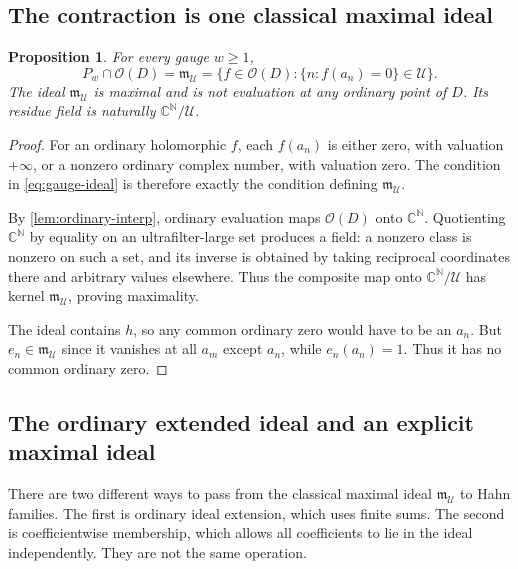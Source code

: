 \documentclass[11pt,letterpaper]{article}
\numberwithin{equation}{section}
\newtheorem{proposition}[theorem]{Proposition}
\theoremstyle{definition}
\theoremstyle{remark}
\newcommand{\C}{\mathbb C}
\newcommand{\N}{\mathbb N}
\newcommand{\OO}{\mathcal O}
\newcommand{\UU}{\mathcal U}
\newcommand{\mm}{\mathfrak m}
\begin{document}
\subsection{The contraction is one classical maximal ideal}
\begin{proposition}\label{prop:contraction}
For every gauge $w\ge1$,
\begin{equation}\label{eq:contraction}
 P_w\cap\OO(D)=\mm_\UU
   =\{f\in\OO(D):\{n:f(a_n)=0\}\in\UU\}.
\end{equation}
The ideal $\mm_\UU$ is maximal and is not evaluation at any ordinary
point of $D$. Its residue field is naturally $\C^\N/\UU$.
\end{proposition}
\begin{proof}
For an ordinary holomorphic $f$, each $f(a_n)$ is either zero, with
valuation $+\infty$, or a nonzero ordinary complex number, with valuation
zero. The condition in \eqref{eq:gauge-ideal} is therefore exactly the
condition defining $\mm_\UU$.

By \cref{lem:ordinary-interp}, ordinary evaluation maps $\OO(D)$ onto
$\C^\N$. Quotienting $\C^\N$ by equality on an ultrafilter-large set
produces a field: a nonzero class is nonzero on such a set, and its inverse
is obtained by taking reciprocal coordinates there and arbitrary values
elsewhere. Thus the composite map onto $\C^\N/\UU$ has kernel
$\mm_\UU$, proving maximality.

The ideal contains $h$, so any common ordinary zero would have to be an
$a_n$. But $e_n\in\mm_\UU$ since it vanishes at all $a_m$ except $a_n$,
while $e_n(a_n)=1$. Thus it has no common ordinary zero.
\end{proof}

\subsection{The ordinary extended ideal and an explicit maximal ideal}
There are two different ways to pass from the classical maximal ideal
$\mm_\UU$ to Hahn families. The first is ordinary ideal extension,
which uses finite sums. The second is coefficientwise membership,
which allows all coefficients to lie in the ideal independently. They
are not the same operation.
\end{document}
